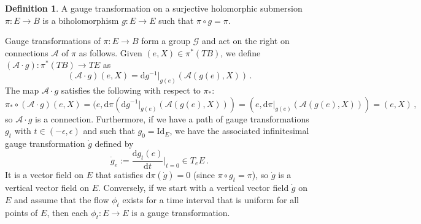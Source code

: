\documentclass{article}
\theoremstyle{definition}
\newtheorem{definition}[theorem]{Definition}
\numberwithin{equation}{section}
\begin{document}
\begin{definition}A gauge transformation on a surjective holomorphic submersion $\pi:E\to B$ is a biholomorphism $g:E\to E$ such that $\pi \circ g=\pi$.
\end{definition}
Gauge transformations of $\pi:E\to B$ form a group $\mathcal{G}$ and act on the right on connections $\mathcal{A}$ of $\pi$ as follows. Given $(e,X)\in \pi^*(TB)$, we define $ (\mathcal{A}\cdot g):\pi^*(TB)\to TE$ as 
\begin{equation}\label{gaugetrans}
    (\mathcal{A}\cdot g)(e,X)=\mathrm{d}g^{-1}|_{g(e)}(\mathcal{A}(g(e),X))\,.
\end{equation}
The map $\mathcal{A}\cdot g$ satisfies the following with respect to $\pi_*$:
\begin{equation*}
    \pi_*\circ (\mathcal{A}\cdot g)(e,X)=(e, \mathrm{d}\pi(\mathrm{d}g^{-1}|_{g(e)}(\mathcal{A}(g(e),X)))=(e, \mathrm{d}\pi|_{g(e)}(\mathcal{A}(g(e),X)))=(e,X)\,,
\end{equation*}
so $\mathcal{A}\cdot g$ is a connection. Furthermore, if we have a path of gauge transformations $g_t$ with $t\in (-\epsilon,\epsilon)$ and such that $g_{0}=\text{Id}_{E}$, we have the associated infinitesimal gauge transformation $\dot{g}$ defined by
\begin{equation*}
    \dot{g}_e:=\frac{\mathrm{d}g_t(e)}{\mathrm{d}t}\Bigg|_{t=0}\in T_eE\,.
\end{equation*}
It is a vector field on $E$ that satisfies $\mathrm{d}\pi(\dot{g})=0$ (since $\pi\circ g_t=\pi$), so $\dot{g}$ is a vertical vector field on $E$. Conversely, if we start with a vertical vector field $\dot{g}$ on $E$ and assume that the flow $\phi_t$ exists for a time interval that is uniform for all points of $E$, then each $\phi_t:E\to E$ is a gauge transformation. 

\end{document}
